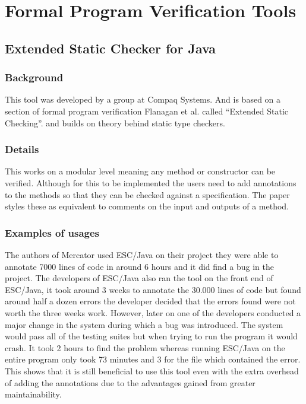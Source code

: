 \documentclass[a4paper,12pt]{scrartcl}
\begin{document}
	\section{Formal Program Verification Tools}
	{
		\subsection{Extended Static Checker for Java\cite{Flanagan2002}}\label{sec:ESCJava}
		{
			\subsubsection{Background}
			{
				This tool was developed by a group at Compaq Systems. And is based on a section of formal program verification Flanagan et al. called \enquote{Extended Static Checking}\cite{Flanagan2002}. and builds on theory behind static type checkers.
			}
			\subsubsection{Details}
			{
				This works on a modular level meaning any method or constructor can be verified. Although for this to be implemented the users need to add annotations to the methods so that they can be checked against a specification. The paper\cite{Flanagan2002} styles these as equivalent to comments on the input and outputs of a method.
			}
			\subsubsection{Examples of usages}
			{
				The authors of Mercator used ESC/Java on their project they were able to annotate 7000 lines of code in around 6 hours and it did find a bug in the project.
				The developers of ESC/Java also ran the tool on the front end of ESC/Java, it took around 3 weeks to annotate the 30.000 lines of code but found around half a dozen errors\cite{Flanagan2002} the developer decided that the errors found were not worth the three weeks work. However, later on one of the developers conducted a major change in the system during which a bug was introduced. The system would pass all of the testing suites but when trying to run the program it would crash. It took 2 hours to find the problem whereas running ESC/Java on the entire program only took 73 minutes and 3 for the file which contained the error. This shows that it is still beneficial to use this tool even with the extra overhead of adding the annotations due to the advantages gained from greater maintainability.
			}

}}
\end{document}
